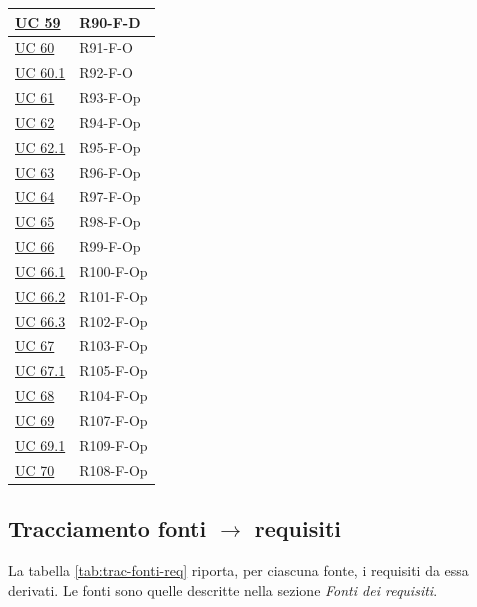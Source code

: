 {\begin{longtable}{|>{\raggedright\arraybackslash}p{3.0cm}|>{\raggedright\arraybackslash}p{12.6cm}|}
    \hyperref[uc:59]{UC 59} & \mbox{R90-F-D} \\ \hline
    \hyperref[uc:60]{UC 60} & \mbox{R91-F-O} \\ \hline
    \hyperref[uc:60.1]{UC 60.1} & \mbox{R92-F-O} \\ \hline
    \hyperref[uc:61]{UC 61} & \mbox{R93-F-Op} \\ \hline
    \hyperref[uc:62]{UC 62} & \mbox{R94-F-Op} \\ \hline
    \hyperref[uc:62.1]{UC 62.1} & \mbox{R95-F-Op} \\ \hline
    \hyperref[uc:63]{UC 63} & \mbox{R96-F-Op} \\ \hline
    \hyperref[uc:64]{UC 64} & \mbox{R97-F-Op} \\ \hline
    \hyperref[uc:65]{UC 65} & \mbox{R98-F-Op} \\ \hline
    \hyperref[uc:66]{UC 66} & \mbox{R99-F-Op} \\ \hline
    \hyperref[uc:66.1]{UC 66.1} & \mbox{R100-F-Op} \\ \hline
    \hyperref[uc:66.2]{UC 66.2} & \mbox{R101-F-Op} \\ \hline
    \hyperref[uc:66.3]{UC 66.3} & \mbox{R102-F-Op} \\ \hline
    \hyperref[uc:67]{UC 67} & \mbox{R103-F-Op} \\ \hline
    \hyperref[uc:67.1]{UC 67.1} & \mbox{R105-F-Op} \\ \hline
    \hyperref[uc:68]{UC 68} & \mbox{R104-F-Op} \\ \hline
    \hyperref[uc:69]{UC 69} & \mbox{R107-F-Op} \\ \hline
    \hyperref[uc:69.1]{UC 69.1} & \mbox{R109-F-Op} \\ \hline
    \hyperref[uc:70]{UC 70} & \mbox{R108-F-Op} \\ \hline
    \end{longtable}
}

\subsection{Tracciamento fonti \texorpdfstring{$\rightarrow$}{→} requisiti}
La tabella \ref{tab:trac-fonti-req} riporta, per ciascuna fonte, i requisiti da essa derivati. Le fonti sono quelle descritte nella sezione \textit{Fonti dei requisiti}.

